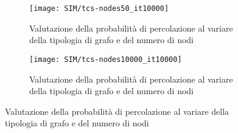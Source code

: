     \begin{figure}[H]
        \begin{minipage}{\linewidth}
            \centering
            \begin{minipage}{0.45\linewidth}
                \begin{figure}[H]
                \texttt{[image: SIM/tcs-nodes50\_it10000]}\caption{Valutazione della probabilità di percolazione al variare della tipologia di grafo e del numero di nodi}
                \label{fig:sim_tcs_nodes_50}
                \end{figure}
            \end{minipage}
            \hspace{0.05\linewidth}
            \begin{minipage}{0.45\linewidth}
                \begin{figure}[H]
                \texttt{[image: SIM/tcs-nodes10000\_it10000]}\caption{Valutazione della probabilità di percolazione al variare della tipologia di grafo e del numero di nodi}
                \label{fig:sim_tcs_nodes_10000}
                \end{figure}
            \end{minipage}
            \caption{Valutazione della probabilità di percolazione al variare della tipologia di grafo e del numero di nodi}
        \end{minipage}
    \end{figure}

